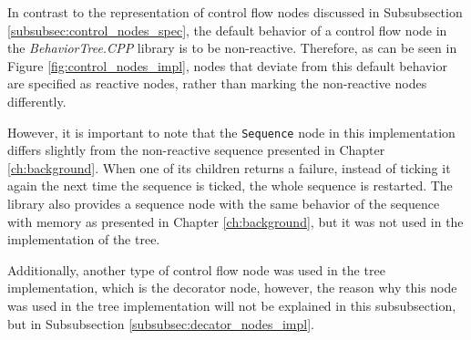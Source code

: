 In contrast to the representation of control flow nodes discussed in Subsubsection \ref{subsubsec:control_nodes_spec}, the default behavior of a control flow node in the \textit{BehaviorTree.CPP} library is to be non-reactive. Therefore, as can be seen in Figure \ref{fig:control_nodes_impl}, nodes that deviate from this default behavior are specified as reactive nodes, rather than marking the non-reactive nodes differently.

However, it is important to note that the \texttt{Sequence} node in this implementation differs slightly from the non-reactive sequence presented in Chapter \ref{ch:background}. When one of its children returns a failure, instead of ticking it again the next time the sequence is ticked, the whole sequence is restarted. The library also provides a sequence node with the same behavior of the sequence with memory as presented in Chapter \ref{ch:background}, but it was not used in the implementation of the tree.

Additionally, another type of control flow node was used in the tree implementation, which is the decorator node, however, the reason why this node was used in the tree implementation will not be explained in this subsubsection, but in Subsubsection \ref{subsubsec:decator_nodes_impl}.

